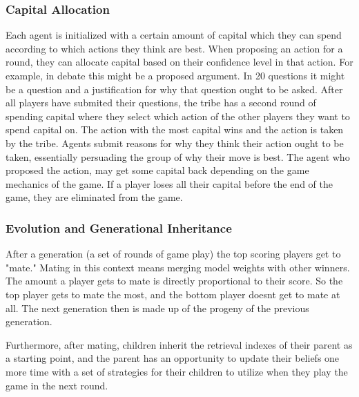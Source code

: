 \subsubsection{Capital Allocation}
Each agent is initialized with a certain amount of capital which they can spend according to which actions they think are best. When proposing an action for a round, they can allocate capital based on their confidence level in that action. For example, in debate this might be a proposed argument. In 20 questions it might be a question and a justification for why that question ought to be asked. After all players have submited their questions, the tribe has a second round of spending capital where they select which action of the other players they want to spend capital on. The action with the most capital wins and the action is taken by the tribe. Agents submit reasons for why they think their action ought to be taken, essentially persuading the group of why their move is best. The agent who proposed the action, may get some capital back depending on the game mechanics of the game. If a player loses all their capital before the end of the game, they are eliminated from the game.

\subsubsection{Evolution and Generational Inheritance}
After a generation (a set of rounds of game play) the top scoring players get to "mate." Mating in this context means merging model weights with other winners. The amount a player gets to mate is directly proportional to their score. So the top player gets to mate the most, and the bottom player doesnt get to mate at all. The next generation then is made up of the progeny of the previous generation.

Furthermore, after mating, children inherit the retrieval indexes of their parent as a starting point, and the parent has an opportunity to update their beliefs one more time with a set of strategies for their children to utilize when they play the game in the next round.